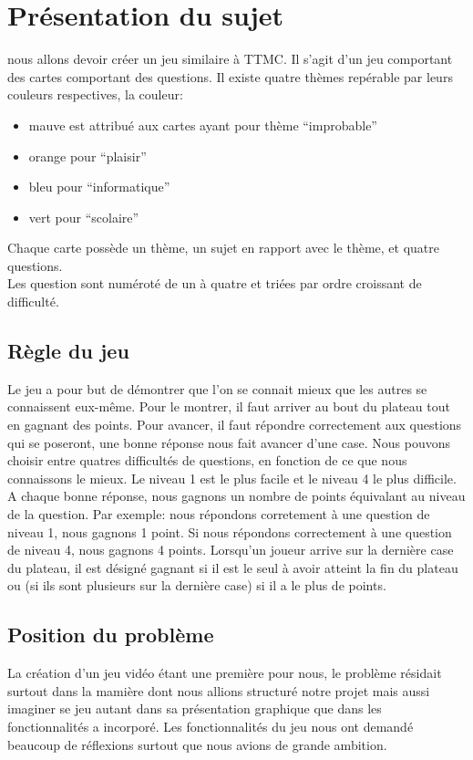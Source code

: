 \section{Présentation du sujet}
nous allons devoir créer un jeu similaire à TTMC.
Il s'agit d'un jeu comportant des cartes comportant des questions. Il existe quatre thèmes repérable par leurs couleurs respectives, la couleur:
\begin{itemize}
	\item mauve est attribué aux cartes ayant pour thème ``improbable''
	\item orange pour ``plaisir''
	\item bleu pour ``informatique''
	\item vert pour ``scolaire''
\end{itemize}
Chaque carte possède un thème, un sujet en rapport avec le thème, et quatre questions.\\
Les question sont numéroté de un à quatre et triées par ordre croissant de difficulté.
\subsection{Règle du jeu}
Le jeu a pour but de démontrer que l'on se connait mieux que les autres se connaissent eux-même.
Pour le montrer, il faut arriver au bout du plateau tout en gagnant des points.
Pour avancer, il faut répondre correctement aux questions qui se poseront, une bonne réponse nous fait avancer d'une case.
Nous pouvons choisir entre quatres difficultés de questions, en fonction de ce que nous connaissons le mieux. Le niveau 1 est le plus facile et le niveau 4 le plus difficile.
A chaque bonne réponse, nous gagnons un nombre de points équivalant au niveau de la question. Par exemple: nous répondons corretement à une question de niveau 1, nous gagnons 1 point. Si nous répondons correctement à une question de niveau 4, 
nous gagnons 4 points. Lorsqu'un joueur arrive sur la dernière case du plateau, il est désigné gagnant si il est le seul à avoir atteint la fin du plateau ou (si ils sont plusieurs sur la dernière case) si il a le plus de points. 

\subsection{Position du problème}
La création d'un jeu vidéo étant une première pour nous, le problème résidait surtout dans la mamière dont nous allions structuré notre projet mais aussi imaginer se jeu autant dans sa présentation graphique que dans les fonctionnalités a 
incorporé. Les fonctionnalités du jeu nous ont demandé beaucoup de réflexions surtout que nous avions de grande ambition.
